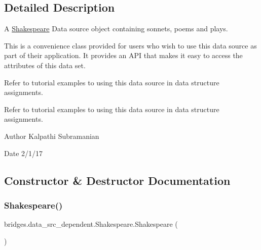 \subsection{Detailed Description}
A \mbox{\hyperlink{classbridges_1_1data__src__dependent_1_1_shakespeare}{Shakespeare}} Data source object containing sonnets, poems and plays. 

This is a convenience class provided for users who wish to use this data source as part of their application. It provides an A\+PI that makes it easy to access the attributes of this data set.

Refer to tutorial examples to using this data source in data structure assignments.

Refer to tutorial examples to using this data source in data structure assignments.

\begin{DoxyAuthor}{Author}
Kalpathi Subramanian 
\end{DoxyAuthor}
\begin{DoxyDate}{Date}
2/1/17 
\end{DoxyDate}


\subsection{Constructor \& Destructor Documentation}
\mbox{\label{classbridges_1_1data__src__dependent_1_1_shakespeare_a34d92b817c4073000de003362e3003fa}} 
\subsubsection{\texorpdfstring{Shakespeare()}{Shakespeare()}\hspace{0.1cm}{\footnotesize\ttfamily [1/2]}}
{\footnotesize\ttfamily bridges.\+data\+\_\+src\+\_\+dependent.\+Shakespeare.\+Shakespeare (\begin{DoxyParamCaption}{ }\end{DoxyParamCaption})}

\mbox{\label{classbridges_1_1data__src__dependent_1_1_shakespeare_aa5a5390d6f7afe3d63f4ad7f9779f9e9}} 
